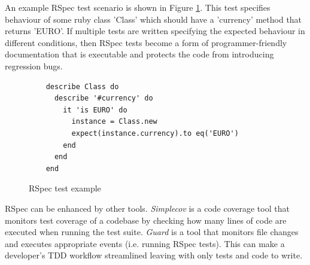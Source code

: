 An example RSpec test scenario is shown in Figure \ref{figure:rspec}. This test
specifies behaviour of some ruby class 'Class' which should have a 'currency'
method that returns 'EURO'. If multiple tests are written specifying the
expected behaviour in different conditions, then RSpec tests become a form of
programmer-friendly documentation that is executable and protects the code from
introducing regression bugs.

\begin{figure}
  \begin{verbatim}
    describe Class do
      describe '#currency' do
        it 'is EURO' do
          instance = Class.new
          expect(instance.currency).to eq('EURO')
        end
      end
    end
  \end{verbatim}
  \caption{
    RSpec test example
    \label{figure:rspec}
  }
\end{figure}

RSpec can be enhanced by other tools. \textit{Simplecov} \parencite{Simplecov}
is a code coverage tool that monitors test coverage of a codebase by checking
how many lines of code are executed when running the test suite. \textit{Guard}
\parencite{Guard} is a tool that monitors file changes and executes appropriate
events (i.e. running RSpec tests). This can make a developer's TDD workflow
streamlined leaving with only tests and code to write.
